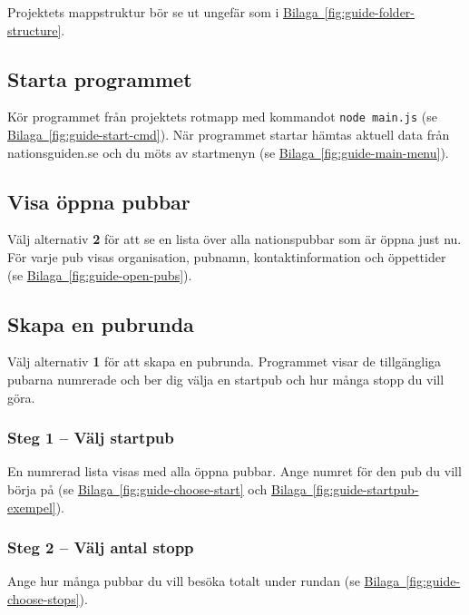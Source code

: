 \documentclass[a4paper, 12pt]{article}
\begin{document}
        Projektets mappstruktur bör se ut ungefär som i \hyperref[fig:guide-folder-structure]{Bilaga~\ref*{fig:guide-folder-structure}}.

    \subsection{Starta programmet}

        Kör programmet från projektets rotmapp med kommandot \texttt{node main.js} (se \hyperref[fig:guide-start-cmd]{Bilaga~\ref*{fig:guide-start-cmd}}).
        När programmet startar hämtas aktuell data från nationsguiden.se och du möts av startmenyn (se \hyperref[fig:guide-main-menu]{Bilaga~\ref*{fig:guide-main-menu}}).

    \subsection{Visa öppna pubbar}

        Välj alternativ \textbf{2} för att se en lista över alla nationspubbar som är öppna just nu. För varje pub visas organisation, pubnamn, kontaktinformation och öppettider (se \hyperref[fig:guide-open-pubs]{Bilaga~\ref*{fig:guide-open-pubs}}).

    \subsection{Skapa en pubrunda}

        Välj alternativ \textbf{1} för att skapa en pubrunda. Programmet visar de tillgängliga pubarna numrerade och ber dig välja en startpub och hur många stopp du vill göra.

        \subsubsection*{Steg 1 -- Välj startpub}

        En numrerad lista visas med alla öppna pubbar. Ange numret för den pub du vill börja på (se \hyperref[fig:guide-choose-start]{Bilaga~\ref*{fig:guide-choose-start}} och \hyperref[fig:guide-startpub-exempel]{Bilaga~\ref*{fig:guide-startpub-exempel}}).

        \subsubsection*{Steg 2 -- Välj antal stopp}

        Ange hur många pubbar du vill besöka totalt under rundan (se \hyperref[fig:guide-choose-stops]{Bilaga~\ref*{fig:guide-choose-stops}}).
\end{document}
